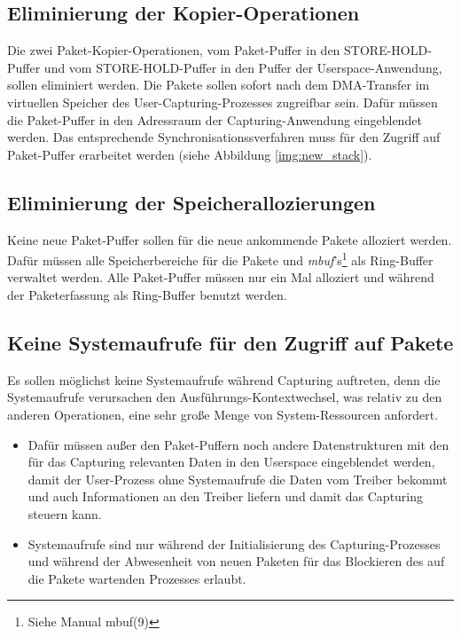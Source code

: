 \subsection{Eliminierung der Kopier-Operationen}
Die zwei Paket-Kopier-Operationen, vom Paket-Puffer in den STORE-HOLD-Puffer
und vom STORE-HOLD-Puffer in den Puffer der Userspace-Anwendung, sollen
eliminiert werden.  Die Pakete sollen sofort nach dem DMA-Transfer im
virtuellen Speicher des User-Capturing-Prozesses zugreifbar sein. Dafür müssen
die Paket-Puffer in den Adressraum der Capturing-Anwendung eingeblendet werden.
Das entsprechende Synchronisationssverfahren muss für den Zugriff auf
Paket-Puffer erarbeitet werden (siehe Abbildung \ref{img:new_stack}).
%
\subsection{Eliminierung der Speicherallozierungen}
Keine neue Paket-Puffer sollen für die neue ankommende Pakete alloziert werden.
Dafür müssen alle Speicherbereiche für die Pakete und
\emph{mbuf}'s\footnote{Siehe Manual mbuf(9)} als Ring-Buffer verwaltet werden.
Alle Paket-Puffer müssen nur ein Mal alloziert und während der Paketerfassung als 
Ring-Buffer benutzt werden. 
\subsection{Keine Systemaufrufe für den Zugriff auf Pakete}
Es sollen möglichst keine Systemaufrufe während Capturing auftreten, denn die
Systemaufrufe verursachen den Ausführungs-Kontextwechsel, was relativ zu den
anderen Operationen, eine sehr große Menge von System-Ressourcen anfordert.
		\begin{itemize}
			\item Dafür müssen außer den Paket-Puffern noch andere
				Datenstrukturen mit den für das Capturing relevanten Daten in den
				Userspace eingeblendet werden, damit der User-Prozess ohne
				Systemaufrufe die Daten vom Treiber bekommt und auch
				Informationen an den Treiber liefern und damit das Capturing
				steuern kann.
			\item   Systemaufrufe sind nur während der Initialisierung des
				Capturing-Prozesses 
				und während der Abwesenheit von neuen
				Paketen für das Blockieren des auf die Pakete wartenden
				Prozesses erlaubt. 
		\end{itemize}

